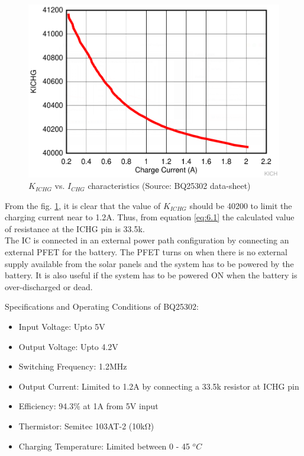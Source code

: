   \begin{center}
 	\begin{figure}[h]
 		\centering
 		\includegraphics[width=0.7\columnwidth]{kich.png}
 		\caption[$K_{ICHG}$ vs. $I_{CHG}$ characteristics]{\centering $K_{ICHG}$ vs. $I_{CHG}$ characteristics (Source: BQ25302 data-sheet)}
 		\label{fig:kichg}
 	\end{figure}
 \end{center}
 From the fig. \ref{fig:kichg}, it is clear that the value of $K_{ICHG}$ should be 40200 to limit the charging current near to 1.2A. Thus, from equation \ref{eq:6.1} the calculated value of resistance at the ICHG pin is 33.5k\ohm.
 \\
 
 The IC is connected in an external power path configuration by connecting an external PFET for the battery. The PFET turns on when there is no external supply available from the solar panels and the system has to be powered by the battery. It is also useful if the system has to be powered ON when the battery is over-discharged or dead. 
 
 
 Specifications and Operating Conditions of BQ25302:
\begin{itemize}
 	\item Input Voltage: Upto 5V
 	\item Output Voltage: Upto 4.2V
 	\item Switching Frequency: 1.2MHz
 	\item Output Current: Limited to 1.2A by connecting a 33.5k resistor at ICHG pin 
 	\item Efficiency: 94.3\% at 1A from 5V input 
 	\item Thermistor: Semitec 103AT-2 (10\si{\kilo\ohm})
 	\item Charging Temperature: Limited between 0 - 45 $^{o}C$
 \end{itemize}

